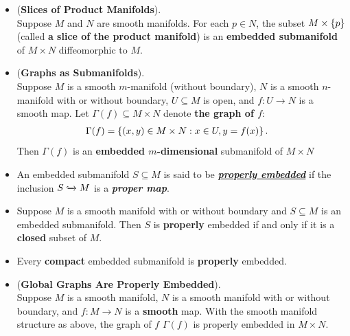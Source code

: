 \documentclass[11pt]{article}
\begin{document}
\begin{itemize}
\item \begin{proposition} (\textbf{Slices of Product Manifolds}). \citep{lee2003introduction}\\
Suppose $M$ and $N$ are smooth manifolds. For each $p \in N$, the subset $M \times \left\{p\right\}$ (called \textbf{a slice of the product manifold}) is an \textbf{embedded submanifold} of $M \times N$ diffeomorphic to $M$.
\end{proposition}

\item \begin{proposition} (\textbf{Graphs as Submanifolds}). \citep{lee2003introduction}\\
Suppose $M$ is a smooth $m$-manifold (without boundary), $N$ is a smooth $n$-manifold with or without boundary, $U \subseteq M$ is open, and $f: U \rightarrow N$ is a smooth map. Let $\Gamma(f) \subseteq M \times N$ denote \textbf{the graph of $f$}:
\begin{align*}
\Gamma(f) &= \left\{ (x,y) \in M \times N: x \in U, y = f(x)\right\}.
\end{align*} Then $\Gamma(f)$ is an \textbf{embedded $m$-dimensional} submanifold of $M \times N$
\end{proposition}

\item \begin{definition}
An embedded submanifold $S \subseteq M$ is said to be \underline{\emph{\textbf{properly embedded}}} if the inclusion $S \xhookrightarrow{} M$ is a \emph{\textbf{proper map}}.
\end{definition}

\item \begin{proposition}
Suppose $M$ is a smooth manifold with or without boundary and $S \subseteq M$ is an embedded submanifold. Then $S$ is \textbf{properly} embedded if and only if it
is a \textbf{closed} subset of $M$.
\end{proposition}

\item \begin{corollary}
Every \textbf{compact} embedded submanifold is \textbf{properly} embedded.
\end{corollary}

\item \begin{proposition} (\textbf{Global Graphs Are Properly Embedded}). \citep{lee2003introduction}\\
Suppose $M$ is a smooth manifold, $N$ is a smooth manifold with or without boundary, and $f: M \rightarrow N$ is a \textbf{smooth} map. With the smooth manifold structure as above, the graph of $f$ $\Gamma(f)$ is properly embedded in $M \times N$.
\end{proposition}
\end{itemize}
\end{document}
